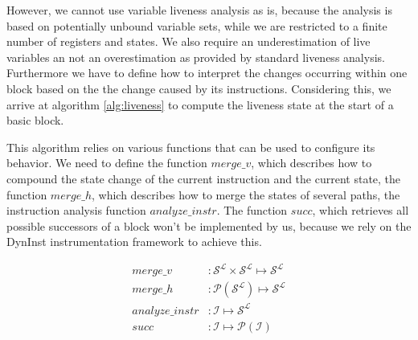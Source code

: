 However, we cannot use variable liveness analysis as is, because the analysis is based on potentially unbound variable sets, 
while we are restricted to a finite number of registers and states. We also require an underestimation of live variables an
not an overestimation as provided by standard liveness analysis. Furthermore we have to define how to interpret the changes
occurring within one block based on the the change caused by its instructions. Considering this, we arrive at 
algorithm \ref{alg:liveness} to compute the liveness state at the start of a basic block.

This algorithm relies on various functions that can be used to configure its behavior. We need to define the function
$merge\_v$, which describes how to compound the state change of the current instruction and the current state, 
the function $merge\_h$, which describes how to merge the states of several paths, the instruction analysis function
$analyze\_instr$. The function $succ$, which retrieves all possible successors of a block won't be implemented by us, 
because we rely on the DynInst instrumentation framework to achieve this.

\begin{subequations}
\label{eq:livenesscustom}
\begin{align}
merge\_v &: \mathcal{S}^\mathcal{L} \times \mathcal{S}^\mathcal{L} \mapsto \mathcal{S}^\mathcal{L}\\
merge\_h &: \mathcal{P}(\mathcal{S}^\mathcal{L}) \mapsto \mathcal{S}^\mathcal{L}\\
analyze\_instr &: \mathcal {I} \mapsto \mathcal{S}^\mathcal{L} \\
succ &: \mathcal{I} \mapsto \mathcal{P}(\mathcal{I})
\end{align}
\end{subequations}

